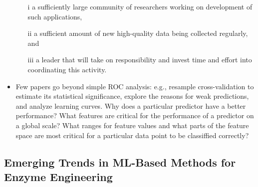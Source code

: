 \documentclass[12pt]{article}
\begin{document}
\begin{itemize}
\begin{itemize}
\item[i] a sufficiently large community of researchers working on development of such applications, 
\item[ii] a sufficient amount of new high-quality data being collected regularly, and 
\item[iii] a leader that will take on responsibility and invest time and effort into coordinating this activity. 
\end{itemize}

\item Few papers go beyond simple ROC analysis: e.g., resample cross-validation to estimate its statistical significance, explore the reasons for weak predictions, and analyze learning curves. Why does a particular predictor have a better performance? What features are critical for the performance of a predictor on a global scale? What ranges for feature values and what parts of the feature space are most critical for a particular data point to be classiffied correctly?
\end{itemize}

\subsection{Emerging Trends in ML-Based Methods for Enzyme Engineering}
\end{document}

